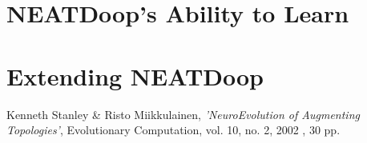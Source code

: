 \documentclass[]{Learning-to-Play-Wolfenstein-thesis}
\begin{document}
\section{NEATDoop's Ability to Learn}
\section{Extending NEATDoop}

\newpage
\begin{thebibliography}{99}
 Kenneth Stanley \& Risto Miikkulainen, \emph{'NeuroEvolution of Augmenting Topologies'}, Evolutionary Computation, vol. 10, no. 2, 2002 , 30 pp.
\end{thebibliography}
\label{endpage}
\end{document}
